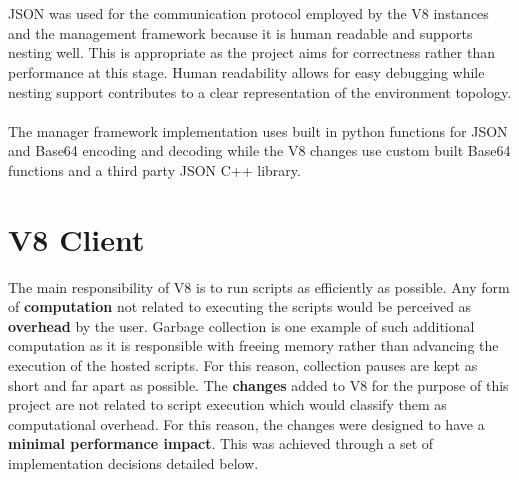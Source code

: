 \documentclass{l4proj}
\begin{document}
\\\\
\hspace*{3em} JSON was used for the communication protocol employed by the V8 instances and the management framework because it is human readable and supports nesting well. This is appropriate as the project aims for correctness rather than performance at this stage. Human readability allows for easy debugging while nesting support contributes to a clear representation of the environment topology.
\\\\
\hspace*{3em} The manager framework implementation uses built in python functions for JSON and Base64 encoding and decoding while the V8 changes use custom built Base64 functions and a third party JSON C++ library.
\section{V8 Client}
\hspace*{3em} The main responsibility of V8 is to run scripts as efficiently as possible. Any form of \textbf{computation} not related to executing the scripts would be perceived as \textbf{overhead} by the user. Garbage collection is one example of such additional computation as it is responsible with freeing memory rather than advancing the execution of the hosted scripts. For this reason, collection pauses are kept as short and far apart as possible. The \textbf{changes} added to V8 for the purpose of this project are not related to script execution which would classify them as computational overhead. For this reason, the changes were designed to have a \textbf{minimal performance impact}. This was achieved through a set of implementation decisions detailed below.
\end{document}
